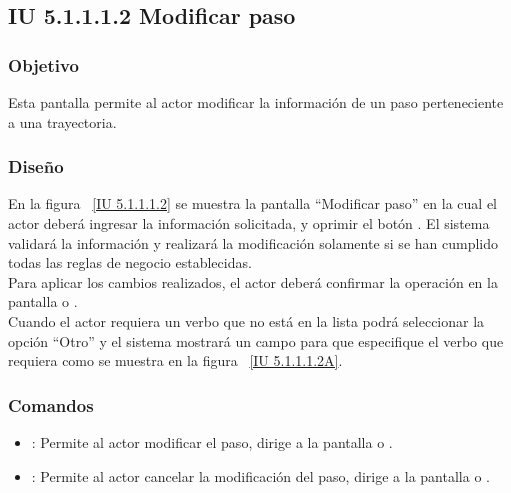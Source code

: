 \subsection{IU 5.1.1.1.2 Modificar paso}

\subsubsection{Objetivo}
	
	Esta pantalla permite al actor modificar la información de un paso perteneciente a una trayectoria.

\subsubsection{Diseño}

    En la figura ~\ref{IU 5.1.1.1.2} se muestra la pantalla ``Modificar paso'' en la cual el actor deberá ingresar la información solicitada, y oprimir el botón . El sistema validará la información y realizará la modificación solamente si se han cumplido todas las reglas de negocio establecidas.\\
	
	Para aplicar los cambios realizados, el actor deberá confirmar la operación en la pantalla  o .\\
    
    Cuando el actor requiera un verbo que no está en la lista podrá seleccionar la opción ``Otro'' y el sistema mostrará un campo para que especifique el verbo que requiera como se muestra en la figura ~\ref{IU 5.1.1.1.2A}. \\
    




\subsubsection{Comandos}
\begin{itemize}
	\item {}: Permite al actor modificar el paso, dirige a la pantalla  o .
	\item {}: Permite al actor cancelar la modificación del paso, dirige a la pantalla  o .
\end{itemize}

